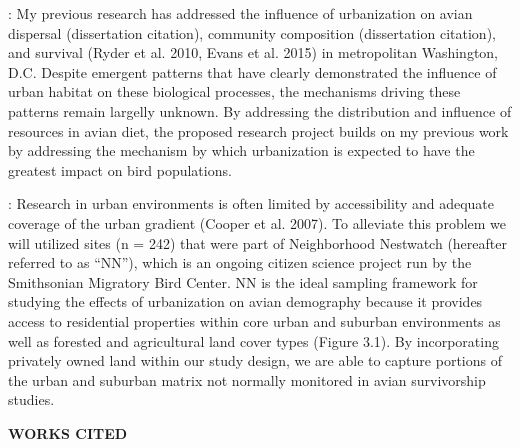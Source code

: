 \documentclass[12pt]{article}
\begin{document}

: 
My previous research has addressed the influence of urbanization on avian dispersal (dissertation citation), community composition (dissertation citation), and survival (Ryder et al. 2010, Evans et al. 2015) in metropolitan Washington, D.C. Despite emergent patterns that have clearly demonstrated the influence of urban habitat on these biological processes, the mechanisms driving these patterns remain largelly unknown. By addressing the distribution and influence of resources in avian diet, the proposed research project builds on my previous work by addressing the mechanism by which urbanization is expected to have the greatest impact on bird populations.


:
Research in urban environments is often limited by accessibility and adequate coverage of the urban gradient (Cooper et al. 2007). To alleviate this problem we will utilized sites (n = 242) that were part of Neighborhood Nestwatch (hereafter referred to as “NN”), which is an ongoing citizen science project run by the Smithsonian Migratory Bird Center. NN is the ideal sampling framework for studying the effects of urbanization on avian demography because it provides access to residential properties within core urban and suburban environments as well as forested and agricultural land cover types (Figure 3.1). By incorporating privately owned land within our study design, we are able to capture portions of the urban and suburban matrix not normally monitored in avian survivorship studies.

\noindent \begin{center} {\textbf {WORKS CITED}}\end{center} \par
\end{document}
